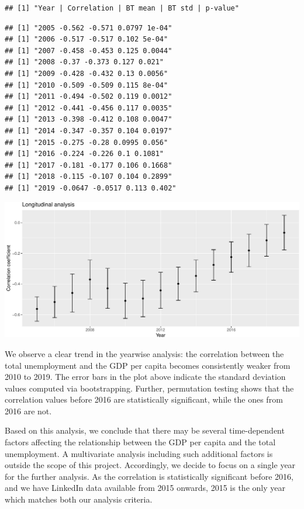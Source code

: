 \documentclass[
]{article}
\begin{document}
\begin{verbatim}
## [1] "Year | Correlation | BT mean | BT std | p-value"
\end{verbatim}

\begin{verbatim}
## [1] "2005 -0.562 -0.571 0.0797 1e-04"
## [1] "2006 -0.517 -0.517 0.102 5e-04"
## [1] "2007 -0.458 -0.453 0.125 0.0044"
## [1] "2008 -0.37 -0.373 0.127 0.021"
## [1] "2009 -0.428 -0.432 0.13 0.0056"
## [1] "2010 -0.509 -0.509 0.115 8e-04"
## [1] "2011 -0.494 -0.502 0.119 0.0012"
## [1] "2012 -0.441 -0.456 0.117 0.0035"
## [1] "2013 -0.398 -0.412 0.108 0.0047"
## [1] "2014 -0.347 -0.357 0.104 0.0197"
## [1] "2015 -0.275 -0.28 0.0995 0.056"
## [1] "2016 -0.224 -0.226 0.1 0.1081"
## [1] "2017 -0.181 -0.177 0.106 0.1668"
## [1] "2018 -0.115 -0.107 0.104 0.2899"
## [1] "2019 -0.0647 -0.0517 0.113 0.402"
\end{verbatim}

\includegraphics{main_files/figure-latex/correlation_one_year-1.pdf}

We observe a clear trend in the yearwise analysis: the correlation
between the total unemployment and the GDP per capita becomes
consistently weaker from 2010 to 2019. The error bars in the plot above
indicate the standard deviation values computed via bootstrapping.
Further, permutation testing shows that the correlation values before
2016 are statistically significant, while the ones from 2016 are not.

Based on this analysis, we conclude that there may be several
time-dependent factors affecting the relationship between the GDP per
capita and the total unemployment. A multivariate analysis including
such additional factors is outside the scope of this project.
Accordingly, we decide to focus on a single year for the further
analysis. As the correlation is statistically significant before 2016,
and we have LinkedIn data available from 2015 onwards, 2015 is the only
year which matches both our analysis criteria.
\end{document}
